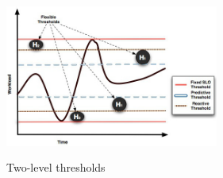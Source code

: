 \begin{figure}
\begin{center}
\includegraphics[width=7cm, height=5.3cm]{./images/thresholdGraphic.jpg}
\end{center}
\vspace{-5mm}
\caption{Two-level  thresholds}
\label{flexibleThresholds}
\end{figure}



\vspace{3mm}

